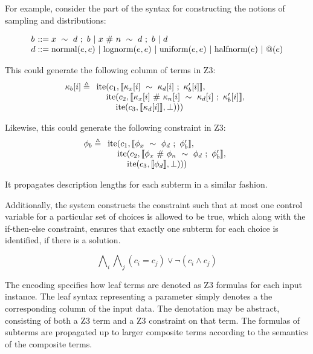 \documentclass[letterpaper]{llncs}
\begin{document}
For example, consider the part of the syntax for constructing the notions of sampling and distributions:

\[
  \begin{array}{l @{} l}
    b &{} ::= x\ \sim\ d\ ;\ b \ |\ x\ \#\ n\ \sim\ d\ ;\ b \ |\ d \\ 
    d &{} ::= 
        \text{normal}(e, e) \ |\ 
        \text{lognorm}(e, e) \ |\ 
        \text{uniform}(e, e) \ |\ 
        \text{halfnorm}(e) \ |\ 
        @(e) \\ 
  \end{array}
\]


This could generate the following column of terms in Z3:
\[
  \kappa_b[i] \triangleq
  \begin{array}[t]{l}
  \text{ite}(c_1, \llbracket \kappa_x[i]\ \sim\ \kappa_d[i]\ ;\ \kappa_b'[i]  \rrbracket, \\
    \hspace{4mm}\text{ite}(c_2, \llbracket \kappa_x[i]\ \#\ \kappa_n[i]\ \sim\ \kappa_d[i]\ ;\ \kappa_b'[i] \rrbracket, \\
        \hspace{8mm}\text{ite}(c_3, \llbracket \kappa_d[i] \rrbracket, \bot)))
  \end{array}
\]

Likewise, this could generate the following constraint in Z3:
\[
  \phi_b \triangleq
  \begin{array}[t]{l}
  \text{ite}(c_1, \llbracket \phi_x\ \sim\ \phi_d\ ;\ \phi_b'  \rrbracket, \\
    \hspace{4mm}\text{ite}(c_2, \llbracket \phi_x\ \#\ \phi_n\ \sim\ \phi_d\ ;\ \phi_b' \rrbracket, \\
        \hspace{8mm}\text{ite}(c_3, \llbracket \phi_d \rrbracket, \bot)))
  \end{array}
\]

It propagates description lengths for each subterm in a similar fashion.

Additionally, the system constructs the constraint such that at most one control variable for a particular set of choices    
is allowed to be true, which along with the if-then-else constraint, ensures
that exactly one subterm for each choice is identified, if there is a solution.  

\[
  \bigwedge\nolimits_i \bigwedge\nolimits_j (c_i = c_j) \vee \neg (c_i \wedge c_j) 
\]


The encoding specifies how leaf terms are denoted as Z3 formulas for each input instance.
The leaf syntax representing a parameter simply denotes a the corresponding column of the input data. 
The denotation may be abstract, consisting of both a Z3 term and a Z3 constraint on that term. 
The formulas of subterms are propagated up to larger composite terms according to the semantics of 
the composite terms.
\end{document}
